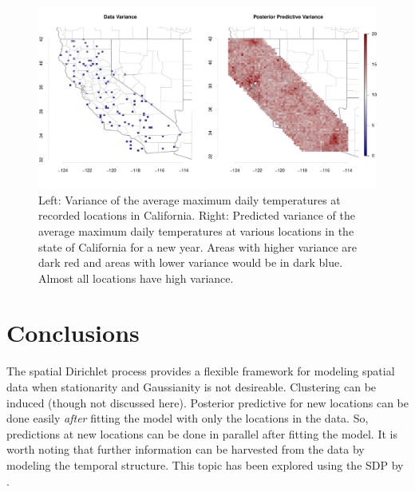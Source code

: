 \documentclass[11pt]{article}
\def\beginmyfig{\begin{figure}[h]\center}
\def\endmyfig{\end{figure}}
\begin{document}
\beginmyfig
  \includegraphics[scale=.5]{../graphs/postpredvar.pdf}
  \caption{Left: Variance of the average maximum daily temperatures at recorded locations
  in California.
  Right: Predicted variance of the average maximum daily temperatures at various locations in
  the state of California for a new year.  Areas with higher variance are dark red and areas 
  with lower variance would be in dark blue. Almost all locations have high variance.}
  \label{fig:postvar}
\endmyfig

\section{Conclusions}
The spatial Dirichlet process provides a flexible framework for modeling
spatial data when stationarity and Gaussianity is not desireable. Clustering
can be induced (though not discussed here). Posterior predictive for new
locations can be done easily \textit{after} fitting the model with only the
locations in the data. So, predictions at new locations can be done in parallel
after fitting the model. It is worth noting that further information can be
harvested from the data by modeling the temporal structure. This topic 
has been explored using the SDP by \cite{tsdp}.

\end{document}
